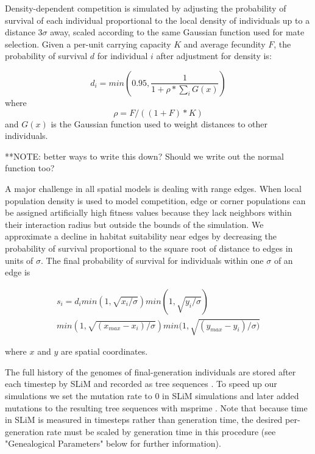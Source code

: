 \documentclass[9pt,twocolumn,twoside]{gsajnl}
\begin{document}
Density-dependent competition is simulated by adjusting the probability of survival of each individual proportional to the local density of individuals up to a distance $3\sigma$ away, scaled according to the same Gaussian function used for mate selection. Given a per-unit carrying capacity $K$ and average fecundity $F$, the probability of survival $d$ for individual $i$ after adjustment for density is:

\begin{equation}
    d_{i}=min(0.95,\frac{1}{1+\rho*\sum_{i}{G(x)}})
\end{equation}
where 
\begin{equation}
    \rho = F/((1+F)*K)
\end{equation} 
and $G(x)$ is the Gaussian function used to weight distances to other individuals. 

**NOTE: better ways to write this down? Should we write out the normal function too?

A major challenge in all spatial models is dealing with range edges. When local population density is used to model competition, edge or corner populations can be assigned artificially high fitness values because they lack neighbors within their interaction radius but outside the bounds of the simulation. We approximate a decline in habitat suitability near edges by decreasing the probability of survival proportional to the square root of distance to edges in units of $\sigma$. The final probability of survival for individuals within one $\sigma$ of an edge is 

\begin{multline}
    s_{i}=d_{i} min(1,\sqrt{x_{i}/\sigma})
    min(1,\sqrt{y_{i}/\sigma})\\
    min(1,\sqrt{(x_{max}-x_{i})/\sigma})
    min(1,\sqrt{(y_{max}-y_{i})/\sigma)}
\end{multline}

where $x$ and $y$ are spatial coordinates. 

The full history of the genomes of final-generation individuals are stored after each timestep by SLiM and recorded as tree sequences \citep{Kelleher2018}. To speed up our simulations we set the mutation rate to 0 in SLiM simulations and later added mutations to the resulting tree sequences with msprime \citep{Kelleher2016}. Note that because time in SLiM is measured in timesteps rather than generation time, the desired per-generation rate must be scaled by generation time in this procedure (see "Genealogical Parameters" below for further information). 
\end{document}
